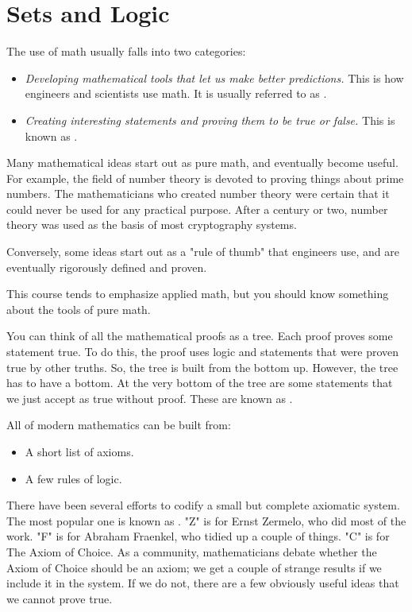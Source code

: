 \chapter{Sets and Logic}

The use of math usually falls into two categories:
\begin{itemize}
\item \textit{Developing mathematical tools that let us make better predictions.}  This is how engineers and scientists use math.  It is usually referred to as .
\item \textit{Creating interesting statements and proving them to be true or false.}  This is known as .
\end{itemize}

Many mathematical ideas start out as pure math, and eventually
become useful. For example, the field of number theory is devoted to
proving things about prime numbers.  The mathematicians who created
number theory were certain that it could never be used for any
practical purpose.  After a century or two, number theory was used as
the basis of most cryptography systems.

Conversely, some ideas start out as a "rule of thumb" that engineers use, and are
eventually rigorously defined and proven.

This course tends to emphasize applied math, but you should know
something about the tools of pure math.

You can think of all the mathematical proofs as a tree. Each proof
proves some statement true. To do this, the proof uses logic and
statements that were proven true by other truths. So, the tree is built
from the bottom up.  However, the tree has to have a bottom. At the
very bottom of the tree are some statements that we just accept as
true without proof.  These are known as .

All of modern mathematics can be built from:
\begin{itemize}
\item A short list of axioms.
\item A few rules of logic.
\end{itemize}

There have been several efforts to codify a small but complete
axiomatic system. The most popular one is known as .  "Z"
is for Ernst Zermelo, who did most of the work.  "F" is for
Abraham Fraenkel, who tidied up a couple of things. "C" is for The
Axiom of Choice.  As a community, mathematicians debate whether the
Axiom of Choice should be an axiom; we get a couple of strange results
if we include it in the system.  If we do not, there are a few obviously
useful ideas that we cannot prove true.

